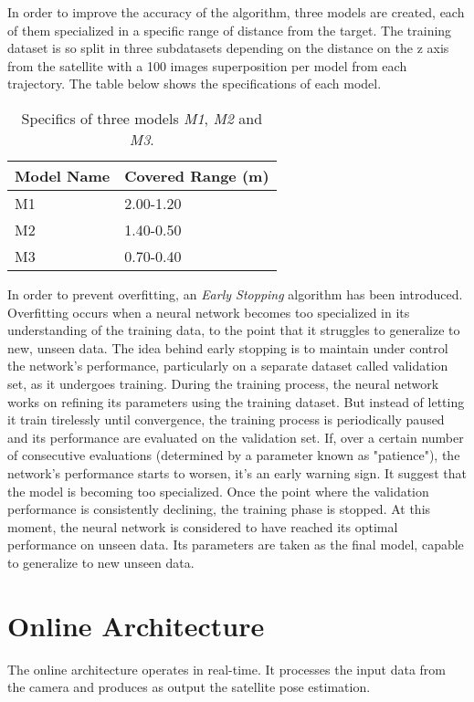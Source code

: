 In order to improve the accuracy of the algorithm, three models are created, each of them specialized in a specific range of distance from the target. The training dataset is so split in three subdatasets depending on the distance on the z axis from the satellite with a 100 images superposition per model from each trajectory. The table below shows the specifications of each model.
\begin{table}[H]
\label{tab:Landmark Mapping Models}
\centering
\begin{tabular}{l|l}
\toprule
Model Name & Covered Range (m)\\
\midrule
M1 & 2.00-1.20 \\
M2 & 1.40-0.50 \\
M3 & 0.70-0.40 \\
\bottomrule
\end{tabular}
\caption{Specifics of three models \textit{M1}, \textit{M2} and \textit{M3}.}
\end{table}
In order to prevent overfitting, an \textit{Early Stopping} algorithm \cite{T81-558} has been introduced. Overfitting occurs when a neural network becomes too specialized in its understanding of the training data, to the point that it struggles to generalize to new, unseen data. The idea behind early stopping is to maintain under control the network's performance, particularly on a separate dataset called validation set, as it undergoes training.
During the training process, the neural network works on refining its parameters using the training dataset. But instead of letting it train tirelessly until convergence, the training process is periodically paused and its performance are evaluated on the validation set. If, over a certain number of consecutive evaluations (determined by a parameter known as "patience"), the network's performance starts to worsen, it's an early warning sign. It suggest that the model is becoming too specialized. Once the point where the validation performance is consistently declining, the training phase is stopped. At this moment, the neural network is considered to have reached its optimal performance on unseen data. Its parameters are taken as the final model, capable to generalize to new unseen data.
\section{Online Architecture}
The online architecture operates in real-time. It processes the input data from the camera and produces as output the satellite pose estimation.

